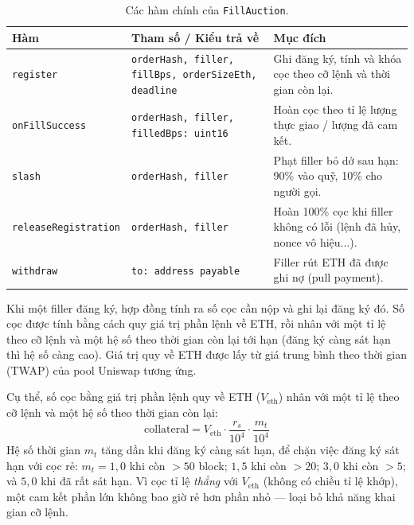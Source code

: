 \documentclass[../DoAn.tex]{subfiles}
\begin{document}
\begin{table}[H]
    \centering
    \caption{Các hàm chính của \texttt{FillAuction}.}
    \label{table:fa_methods}
    \begin{tabular}{|p{4cm}|p{4.5cm}|p{5.5cm}|}
        \hline
        \textbf{Hàm} & \textbf{Tham số / Kiểu trả về} & \textbf{Mục đích} \\
        \hline
        \texttt{register} &
            \texttt{orderHash, filler,} \newline \texttt{fillBps, orderSizeEth,} \newline \texttt{deadline} &
            Ghi đăng ký, tính và khóa cọc theo cỡ lệnh và thời gian còn lại. \\
        \hline
        \texttt{onFillSuccess} &
            \texttt{orderHash, filler,} \newline \texttt{filledBps: uint16} &
            Hoàn cọc theo tỉ lệ lượng thực giao / lượng đã cam kết. \\
        \hline
        \texttt{slash} &
            \texttt{orderHash, filler} &
            Phạt filler bỏ dở sau hạn: 90\% vào quỹ, 10\% cho người gọi. \\
        \hline
        \texttt{release}\newline\texttt{Registration} &
            \texttt{orderHash, filler} &
            Hoàn 100\% cọc khi filler không có lỗi (lệnh đã hủy, nonce vô hiệu...). \\
        \hline
        \texttt{withdraw} &
            \texttt{to: address payable} &
            Filler rút ETH đã được ghi nợ (pull payment). \\
        \hline
    \end{tabular}
\end{table}

Khi một filler đăng ký, hợp đồng tính ra số cọc cần nộp và ghi lại đăng ký đó. Số cọc được tính bằng cách quy giá trị phần lệnh về ETH, rồi nhân với một tỉ lệ theo cỡ lệnh và một hệ số theo thời gian còn lại tới hạn (đăng ký càng sát hạn thì hệ số càng cao). Giá trị quy về ETH được lấy từ giá trung bình theo thời gian (TWAP) của pool Uniswap tương ứng.

Cụ thể, số cọc bằng giá trị phần lệnh quy về ETH ($V_{\text{eth}}$) nhân với một tỉ lệ theo cỡ lệnh và một hệ số theo thời gian còn lại:
\begin{equation}
    \text{collateral} = V_{\text{eth}} \cdot \frac{r_s}{10^4} \cdot \frac{m_t}{10^4}
    \label{eq:collateral}
\end{equation}
Hệ số thời gian $m_t$ tăng dần khi đăng ký càng sát hạn, để chặn việc đăng ký sát hạn với cọc rẻ: $m_t = 1{,}0$ khi còn $>50$ block; $1{,}5$ khi còn $>20$; $3{,}0$ khi còn $>5$; và $5{,}0$ khi đã rất sát hạn. Vì cọc tỉ lệ \emph{thẳng} với $V_{\text{eth}}$ (không có chiều tỉ lệ khớp), một cam kết phần lớn không bao giờ rẻ hơn phần nhỏ --- loại bỏ khả năng khai gian cỡ lệnh.
\end{document}
